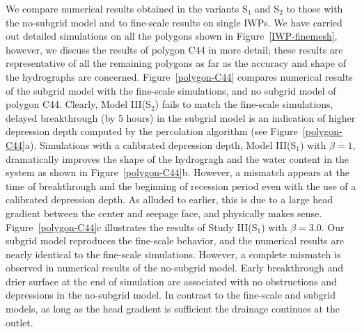\documentclass[review,11pt]{elsarticle}
\begin{document}
We compare numerical results obtained in the variants S$_1$ and S$_2$ to those with the no-subgrid model and to fine-scale results on single IWPs. We have carried out detailed simulations on all the polygons shown in Figure~\ref{IWP-finemesh}, however, we discuss the results of polygon C44 in more detail; these results are representative of all the remaining polygons as far as the accuracy and shape of the hydrographs are concerned. 
Figure~\ref{polygon-C44} compares numerical results of the subgrid model with the fine-scale simulations, and no subgrid model of polygon C44. 
Clearly, Model III(S$_2$) fails to match the fine-scale simulations, delayed breakthrough (by 5 hours) in the subgrid model is an indication of higher depression depth computed by the percolation algorithm (see Figure~\ref{polygon-C44}a). 
Simulations with a calibrated depression depth, Model III(S$_1$) with $\beta = 1$, dramatically improves the shape of the hydrogragh and the water content in the system as shown in Figure~\ref{polygon-C44}b. 
However, a mismatch appears at the time of breakthrough and the beginning of recession period even with the use of a calibrated depression depth. 
As alluded to earlier, this is due to a large head gradient between the center and seepage face, and physically makes sense. 
Figure~\ref{polygon-C44}c illustrates the results of Study III(S$_1$) with $\beta = 3.0$.
Our subgrid model reproduces the fine-scale behavior, and the numerical results are nearly identical to the fine-scale simulations. 
However, a complete mismatch is observed in numerical results of the no-subgrid model. Early breakthrough and drier surface at the end of simulation are associated with no obstructions and depressions in the no-subgrid model. 
In contrast to the fine-scale and subgrid models, as long as the head gradient is sufficient the drainage continues at the outlet.
\end{document}
